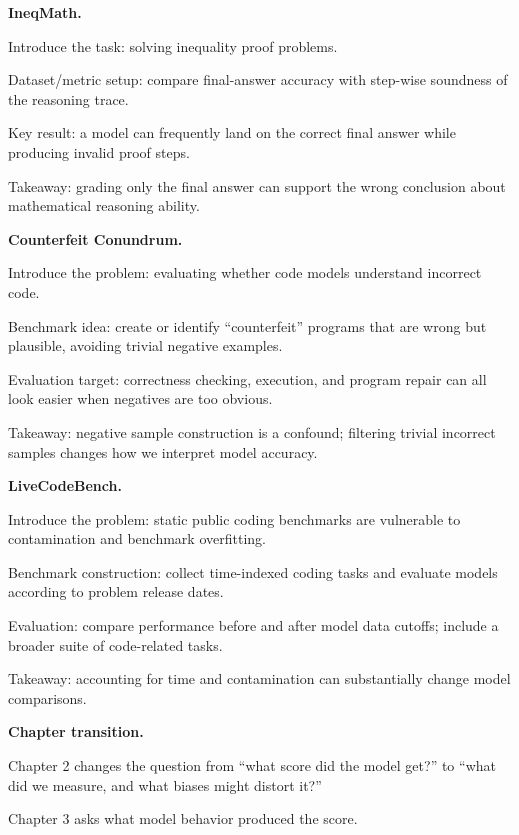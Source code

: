 \documentclass[10pt,twocolumn]{article}
\let\olditemize\itemize
\let\oldenditemize\enditemize
\renewenvironment{itemize}{\olditemize
  \setlength{\itemsep}{1pt}
  \setlength{\parskip}{0pt}
  \setlength{\parsep}{0pt}
  \setlength{\topsep}{2pt}
}{\oldenditemize}
\begin{document}
\textbf{IneqMath.}
\begin{itemize}
  \item Introduce the task: solving inequality proof problems.
  \item Dataset/metric setup: compare final-answer accuracy with step-wise soundness of the reasoning trace.
  \item Key result: a model can frequently land on the correct final answer while producing invalid proof steps.
  \item Takeaway: grading only the final answer can support the wrong conclusion about mathematical reasoning ability.
\end{itemize}

\textbf{Counterfeit Conundrum.}
\begin{itemize}
  \item Introduce the problem: evaluating whether code models understand incorrect code.
  \item Benchmark idea: create or identify ``counterfeit'' programs that are wrong but plausible, avoiding trivial negative examples.
  \item Evaluation target: correctness checking, execution, and program repair can all look easier when negatives are too obvious.
  \item Takeaway: negative sample construction is a confound; filtering trivial incorrect samples changes how we interpret model accuracy.
\end{itemize}

\textbf{LiveCodeBench.}
\begin{itemize}
  \item Introduce the problem: static public coding benchmarks are vulnerable to contamination and benchmark overfitting.
  \item Benchmark construction: collect time-indexed coding tasks and evaluate models according to problem release dates.
  \item Evaluation: compare performance before and after model data cutoffs; include a broader suite of code-related tasks.
  \item Takeaway: accounting for time and contamination can substantially change model comparisons.
\end{itemize}

\textbf{Chapter transition.}
\begin{itemize}
  \item Chapter 2 changes the question from ``what score did the model get?'' to ``what did we measure, and what biases might distort it?''
  \item Chapter 3 asks what model behavior produced the score.
\end{itemize}
\end{document}
